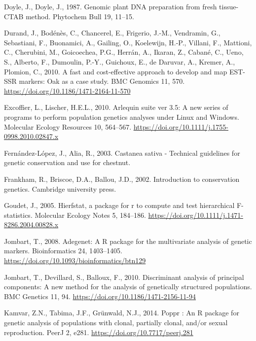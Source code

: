 \documentclass[12pt,a4paper,]{report}
\begin{document}
\leavevmode\hypertarget{ref-doyle1987genomic}{}%
Doyle, J., Doyle, J., 1987. Genomic plant DNA preparation from fresh
tissue-CTAB method. Phytochem Bull 19, 11--15.

\leavevmode\hypertarget{ref-durand_fast_2010}{}%
Durand, J., Bodénès, C., Chancerel, E., Frigerio, J.-M., Vendramin, G.,
Sebastiani, F., Buonamici, A., Gailing, O., Koelewijn, H.-P., Villani,
F., Mattioni, C., Cherubini, M., Goicoechea, P.G., Herrán, A., Ikaran,
Z., Cabané, C., Ueno, S., Alberto, F., Dumoulin, P.-Y., Guichoux, E., de
Daruvar, A., Kremer, A., Plomion, C., 2010. A fast and cost-effective
approach to develop and map EST-SSR markers: Oak as a case study. BMC
Genomics 11, 570. \url{https://doi.org/10.1186/1471-2164-11-570}

\leavevmode\hypertarget{ref-excoffier_arlequin_2010}{}%
Excoffier, L., Lischer, H.E.L., 2010. Arlequin suite ver 3.5: A new
series of programs to perform population genetics analyses under Linux
and Windows. Molecular Ecology Resources 10, 564--567.
\url{https://doi.org/10.1111/j.1755-0998.2010.02847.x}

\leavevmode\hypertarget{ref-fernandez-lopez_castanea_2003}{}%
Fernández-López, J., Alia, R., 2003. Castanea sativa - Technical
guidelines for genetic conservation and use for chestnut.

\leavevmode\hypertarget{ref-frankham_introduction_2002}{}%
Frankham, R., Briscoe, D.A., Ballou, J.D., 2002. Introduction to
conservation genetics. Cambridge university press.

\leavevmode\hypertarget{ref-goudet_hierfstat_2005}{}%
Goudet, J., 2005. Hierfstat, a package for r to compute and test
hierarchical F-statistics. Molecular Ecology Notes 5, 184--186.
\url{https://doi.org/10.1111/j.1471-8286.2004.00828.x}

\leavevmode\hypertarget{ref-Jombart2008}{}%
Jombart, T., 2008. Adegenet: A R package for the multivariate analysis
of genetic markers. Bioinformatics 24, 1403--1405.
\url{https://doi.org/10.1093/bioinformatics/btn129}

\leavevmode\hypertarget{ref-Jombart2010}{}%
Jombart, T., Devillard, S., Balloux, F., 2010. Discriminant analysis of
principal components: A new method for the analysis of genetically
structured populations. BMC Genetics 11, 94.
\url{https://doi.org/10.1186/1471-2156-11-94}

\leavevmode\hypertarget{ref-Kamvar2014}{}%
Kamvar, Z.N., Tabima, J.F., Grünwald, N.J., 2014. Poppr : An R package
for genetic analysis of populations with clonal, partially clonal,
and/or sexual reproduction. PeerJ 2, e281.
\url{https://doi.org/10.7717/peerj.281}
\end{document}
